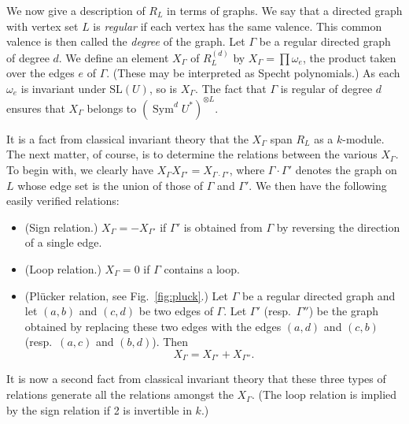\documentclass{amsart}
\theoremstyle{definition}
\theoremstyle{remark}
\DeclareMathOperator{\Sym}{Sym}
\def\SL{\mathrm{SL}}
\begin{document}
We now give a description of $R_L$ in terms of graphs.  We say that a
directed graph with vertex set $L$ is \emph{regular} if each vertex has the
same valence.  This common valence is then called the \emph{degree} of the
graph.  Let $\Gamma$ be a regular directed graph of degree $d$.  We define an
element $X_{\Gamma}$ of $R_L^{(d)}$ by $X_{\Gamma}=\prod \omega_e$, the
product taken over the edges $e$ of $\Gamma$.
(These may be interpreted as Specht polynomials.)
As each $\omega_e$ is invariant
under $\SL(U)$, so is $X_{\Gamma}$.  The fact that $\Gamma$ is regular of
degree $d$ ensures that $X_{\Gamma}$ belongs to $(\Sym^d{U^*})^{\otimes L}$.

It is a fact from classical invariant theory that the $X_{\Gamma}$ span
$R_L$ as a $k$-module.  The next matter, of course, is to determine the
relations between the various $X_{\Gamma}$.  To begin with, we clearly have
$X_{\Gamma} X_{\Gamma'}=X_{\Gamma \cdot \Gamma'}$, where $\Gamma \cdot \Gamma'$
denotes the graph on $L$ whose edge set is the union of those of $\Gamma$ and
$\Gamma'$.  We then have the following easily verified relations:
\begin{itemize}
\item (Sign relation.) $X_{\Gamma}=-X_{\Gamma'}$ if $\Gamma'$ is
obtained from $\Gamma$ by reversing the direction of a single edge.
\item (Loop relation.) $X_{\Gamma}=0$ if $\Gamma$ contains a loop.
\item (Pl\"ucker relation, see Fig.~\ref{fig:pluck}.)  Let $\Gamma$ be a
regular directed graph and let $(a, b)$ and $(c, d)$ be two edges of $\Gamma$.
Let $\Gamma'$ (resp.\ $\Gamma''$) be the graph obtained by replacing these two
edges with the edges $(a, d)$ and $(c, b)$ (resp.\ $(a, c)$ and $(b, d)$).
Then
\begin{displaymath}
X_{\Gamma}=X_{\Gamma'}+X_{\Gamma''}.
\end{displaymath}
\end{itemize}
It is now a second fact from classical invariant theory that these three
types of relations generate all the relations amongst the $X_{\Gamma}$.  (The
loop relation is implied by the sign relation if 2 is invertible in $k$.)
\end{document}
